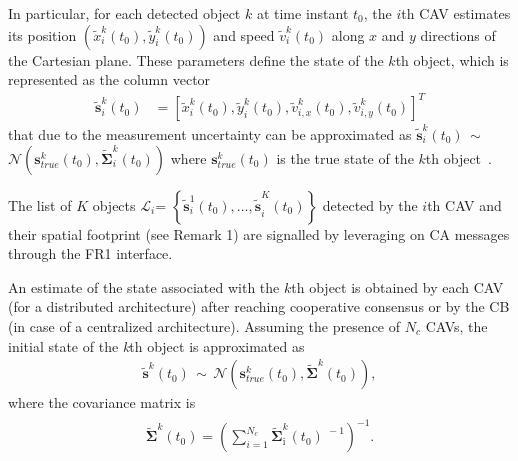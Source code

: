 \documentclass[journal]{IEEEtran}
\begin{document}
In particular, for each detected object $k$ at time instant $t_0$, the $i$th CAV estimates its position $(\tilde{x}_i^{k}(t_0), \tilde{y}_i^{k}(t_0))$ and speed $\tilde{v}_i^{k}(t_0)$ along $x$ and $y$ directions of the Cartesian plane. These parameters define the state of the $k$th object, which is represented as the column vector
\begin{align} \label{eq:initial_error}
        \mathbf{\tilde{s}}^{k}_i (t_0) &= \left[\tilde{x}_i^{k} (t_0), \tilde{y}_i^{k} (t_0), \tilde{v}_{i,x}^{k} (t_0),  \tilde{v}_{i,y}^{k} (t_0)\right]^T %
\end{align} 
%
that due to the measurement uncertainty can be approximated as $\mathbf{\tilde{s}}^{k}_i (t_0)$$\,\sim\,$$\mathcal{N}\left(\mathbf{s}^{k}_{true} (t_0), \boldsymbol{\tilde{\Sigma}}_i^k (t_0)\right)$ where $\mathbf{s}^{k}_{true} (t_0)$ is the true state of the $k$th object~\cite{s21010200}.

The list of $K$ objects $\mathcal{L}_i $= $ \left\{{\mathbf{\tilde{s}}^1_i(t_0),\ldots,\tilde{\mathbf{s}}}^K_i(t_0)\right\}$ detected by the $i$th CAV and their spatial footprint (see Remark 1) are signalled by leveraging on CA messages through the FR1 interface.

An estimate of the state associated with the $k$th object is obtained by each CAV (for a distributed architecture) after reaching cooperative consensus or by the CB (in case of a centralized architecture). 
Assuming the presence of $N_c$ CAVs, the initial state of the \textit{k}th object is approximated as
\begin{align} \label{eq:state_after_cons}
\mathbf{\tilde{s}}^{k} (t_0)\,\sim\,\mathcal{N}\left( \mathbf{s}^{k}_{true} (t_0),  \boldsymbol{\tilde{\Sigma}}^k (t_0)\right  ),
\end{align}
where the covariance matrix is %
\begin{align}\label{eq:cov}
    \begin{split}
        \boldsymbol{\tilde{\Sigma}}^k(t_0)= \left(\sum_{i=1}^{N_c} \boldsymbol{\tilde{\Sigma}}^k_{\text{i}}(t_0)^{\,\,-1}\right)^{-1}. %
    \end{split}
\end{align}
\end{document}
